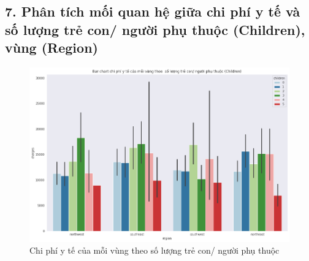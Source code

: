 \documentclass{article}
\begin{document}
	\subsection{7. Phân tích mối quan hệ giữa chi phí y tế và  số lượng trẻ con/ người phụ thuộc (Children), vùng (Region)}
	\begin{figure}[H]
		\centering
		\includegraphics[width=1\textwidth]{images/bar_chart_medical_charges_region_children.png}
		\caption{Chi phí y tế của mỗi vùng theo số lượng trẻ con/ người phụ thuộc}
		\label{fig:writing-thesis}
	\end{figure}
	
\end{document}
